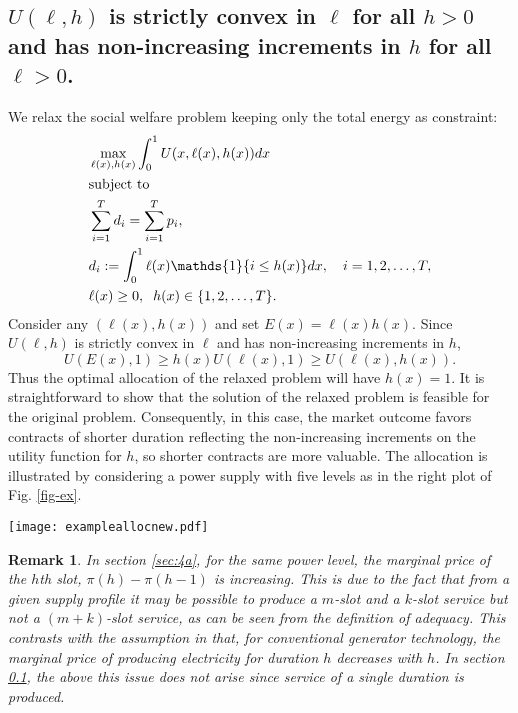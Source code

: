 \documentclass[10pt,draftcls,onecolumn]{IEEEtran}
\newtheorem{remark}{Remark}
\def\ind{{\mathds{1}}}
\newcounter{l1}
\newcounter{l2}
\newcounter{l3}
\begin{document}
\subsection{$U(\ell,h)$ is strictly convex in $\ell$ for all $h>0$ and has non-increasing increments in $h$ for all $\ell>0$.} \label{sec:4b}
We relax the social welfare problem keeping only the total energy as constraint:
\begin{align}
    &\max_{\ell(x),h(x)} \int_0^1 U(x,\ell(x),h(x))dx \notag \\
    & \mbox{subject to} \notag \\
    &\sum_{i=1}^T d_i = \sum_{i=1}^T p_i ,\notag\\
&d_i := \int_0^1 \ell(x)\ind{\{i \leq h(x)\}}dx, \quad i=1,2,\ldots,T, \notag \\
    & \ell(x) \geq 0,\;\;h(x) \in \{1,2,\ldots,T \}.
\end{align}
Consider any $(\ell(x), h(x))$ and set $E(x) = \ell(x)h(x)$. Since $U(\ell, h)$ is strictly convex in $\ell$ and has non-increasing increments in $h$, 
\begin{equation}
U(E(x),1) \geq h(x) U(\ell(x),1) \geq U(\ell(x),h(x)).
\end{equation}
Thus the optimal allocation of the relaxed problem will have $h(x)=1$. It is straightforward to show that the solution of the relaxed problem is feasible for the original problem. Consequently, in this case, the market outcome  favors contracts of shorter duration reflecting the non-increasing increments on the utility function for $h$, so shorter contracts are more valuable. The  allocation is illustrated by considering a power supply with five levels as in the right plot of Fig. \ref{fig-ex}.

\begin{figure*}[!t]
\centering
\texttt{[image: exampleallocnew.pdf]}
\caption{Optimal allocations for different forms of the utility functions.}
\label{fig-ex}
\end{figure*}
\begin{remark}{ In section \ref{sec:4a}, for the same power level, the marginal price of the $h$th slot, $\pi(h) - \pi(h-1)$ is \textit{increasing}.  This is due to the fact that from a given 
supply profile it may be possible to produce  a $m$-slot and a $k$-slot service but not a $(m+k)$-slot service, as can be seen from the definition of adequacy.  This contrasts with the assumption in  \cite{Chao-Oren86} that, for conventional generator technology, the marginal price of producing electricity for duration $h$ decreases with $h$. In section \ref{sec:4b}, the  above this issue does not arise since service of a single duration is produced.}
\end{remark}
\end{document}
